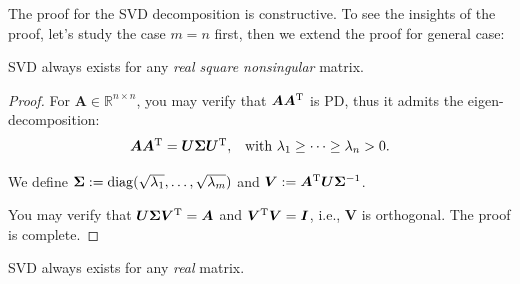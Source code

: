 The proof for the SVD decomposition is constructive. To see the insights of the proof, let's study the case $m=n$ first, then we extend the proof for general case:
\begin{proposition}
SVD always exists for any \emph{real square nonsingular} matrix.
\end{proposition}
\begin{proof}
For $\bm A\in\mathbb{R}^{n\times n}$, you may verify that $\bm A\bm A^{\mathrm T}$ is PD, thus it admits the eigen-decomposition:
\begin{equation}
\begin{array}{ll}
\bm A\bm A^{\mathrm T}=\bm U\bm\Sigma\bm U^{\mathrm T},
&
\mbox{with }\lambda_1\ge\cdots\ge\lambda_n>0.
\end{array}
\end{equation}

We define $\bm\Sigma:=\operatorname{diag}(\sqrt{\lambda_1},\dots,\sqrt{\lambda_m})$ and $\bm V:=\bm A^{\mathrm T}\bm U\bm\Sigma^{-1}$.

You may verify that $\bm U\bm\Sigma\bm V^{\mathrm T}=\bm A$ and $\bm V^{\mathrm T}\bm V=\bm I$, i.e., $\bm V$ is orthogonal. The proof is complete.
\end{proof}
\begin{proposition}
SVD always exists for any \emph{real} matrix.
\end{proposition}
